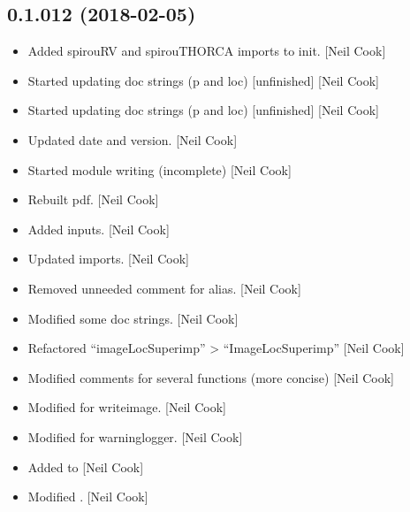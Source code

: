 \documentclass[a4paper,10pt,english]{report}
\begin{document}
\subsection{0.1.012 (2018-02-05)}
\label{\detokenize{misc/changelog:id492}}\begin{itemize}
\item {} 
Added spirouRV and spirouTHORCA imports to init. {[}Neil Cook{]}

\item {} 
Started updating doc strings (p and loc) {[}unfinished{]} {[}Neil Cook{]}

\item {} 
Started updating doc strings (p and loc) {[}unfinished{]} {[}Neil Cook{]}

\item {} 
Updated date and version. {[}Neil Cook{]}

\item {} 
Started module writing (incomplete) {[}Neil Cook{]}

\item {} 
Rebuilt pdf. {[}Neil Cook{]}

\item {} 
Added inputs. {[}Neil Cook{]}

\item {} 
Updated imports. {[}Neil Cook{]}

\item {} 
Removed unneeded comment for alias. {[}Neil Cook{]}

\item {} 
Modified some doc strings. {[}Neil Cook{]}

\item {} 
Refactored “imageLocSuperimp” \textendash{}\textgreater{} “ImageLocSuperimp” {[}Neil Cook{]}

\item {} 
Modified comments for several functions (more concise) {[}Neil Cook{]}

\item {} 
Modified  for writeimage. {[}Neil Cook{]}

\item {} 
Modified  for warninglogger. {[}Neil Cook{]}

\item {} 
Added to  {[}Neil Cook{]}

\item {} 
Modified  . {[}Neil Cook{]}


\end{itemize}
\end{document}
